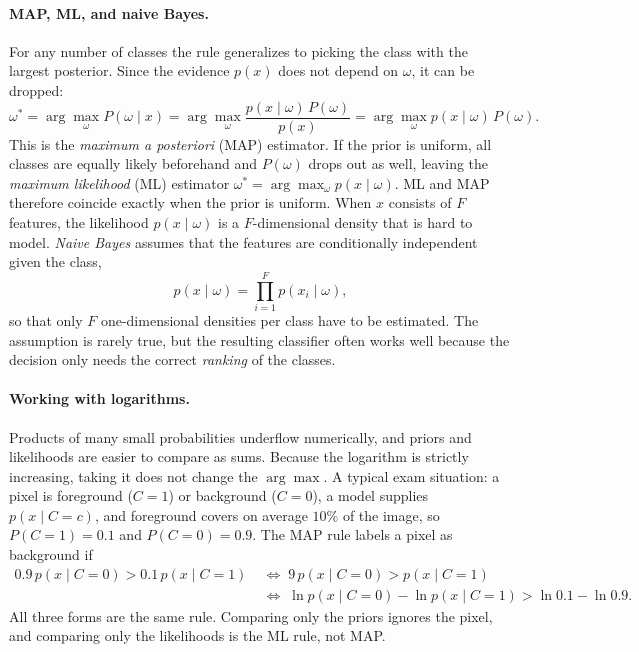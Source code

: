 \paragraph{MAP, ML, and naive Bayes.}
For any number of classes the rule generalizes to picking the class with the
largest posterior. Since the evidence $p(x)$ does not depend on $\omega$, it can
be dropped:
\begin{equation}
  \omega^* = \arg\max_\omega P(\omega\mid x)
  = \arg\max_\omega \frac{p(x\mid\omega)\,P(\omega)}{p(x)}
  = \arg\max_\omega p(x\mid\omega)\,P(\omega).
  \label{eq:map}
\end{equation}
\noindent
This is the \emph{maximum a posteriori} (MAP) estimator. If the prior is
uniform, all classes are equally likely beforehand and $P(\omega)$ drops out as
well, leaving the \emph{maximum likelihood} (ML) estimator
$\omega^* = \arg\max_\omega p(x\mid\omega)$. ML and MAP therefore coincide
exactly when the prior is uniform. When $x$ consists of $F$ features, the
likelihood $p(x\mid\omega)$ is a $F$-dimensional density that is hard to model.
\emph{Naive Bayes} assumes that the features are conditionally independent
given the class,
\begin{equation}
  p(x\mid\omega) = \prod_{i=1}^{F} p(x_i\mid\omega),
\end{equation}
\noindent
so that only $F$ one-dimensional densities per class have to be estimated. The
assumption is rarely true, but the resulting classifier often works well
because the decision only needs the correct \emph{ranking} of the classes.

\paragraph{Working with logarithms.}
Products of many small probabilities underflow numerically, and priors and
likelihoods are easier to compare as sums. Because the logarithm is strictly
increasing, taking it does not change the $\arg\max$. A typical exam situation:
a pixel is foreground ($C=1$) or background ($C=0$), a model supplies
$p(x\mid C=c)$, and foreground covers on average $10\%$ of the image, so
$P(C=1) = 0.1$ and $P(C=0) = 0.9$. The MAP rule labels a pixel as background if
\begin{align}
  0.9\,p(x\mid C=0) > 0.1\,p(x\mid C=1)
  \;&\Longleftrightarrow\;
  9\,p(x\mid C=0) > p(x\mid C=1) \nonumber\\
  &\Longleftrightarrow\;
  \ln p(x\mid C=0) - \ln p(x\mid C=1) > \ln 0.1 - \ln 0.9 .
\end{align}
\noindent
All three forms are the same rule. Comparing only the priors ignores the pixel,
and comparing only the likelihoods is the ML rule, not MAP.

